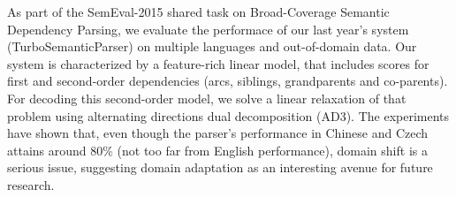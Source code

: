 As part of the SemEval-2015 shared task on Broad-Coverage Semantic Dependency Parsing, we evaluate the performace of our last year's system (TurboSemanticParser) on multiple languages and out-of-domain data. Our system is characterized by a feature-rich linear model, that includes scores for first and second-order dependencies (arcs, siblings, grandparents and co-parents). For decoding this second-order model, we solve a linear relaxation of that problem using alternating directions dual decomposition (AD3). The experiments have shown that, even though the parser's performance in Chinese and Czech attains around 80\% (not too far from English performance), domain shift is a serious issue, suggesting domain adaptation as an interesting avenue for future research.
